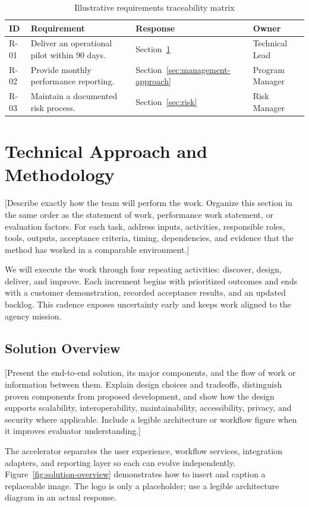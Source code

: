 \begin{table}[htbp]
\centering
\caption{Illustrative requirements traceability matrix}
\label{tab:compliance}
\begin{tabularx}{\textwidth}{@{}lXll@{}}
\toprule
ID & Requirement & Response & Owner \\
\midrule
R-01 & Deliver an operational pilot within 90 days. & Section~\ref{sec:technical-approach} & Technical Lead \\
R-02 & Provide monthly performance reporting. & Section~\ref{sec:management-approach} & Program Manager \\
R-03 & Maintain a documented risk process. & Section~\ref{sec:risk} & Risk Manager \\
\bottomrule
\end{tabularx}
\end{table}

\section{Technical Approach and Methodology}
\label{sec:technical-approach}
[Describe exactly how the team will perform the work. Organize this section in
the same order as the statement of work, performance work statement, or
evaluation factors. For each task, address inputs, activities, responsible
roles, tools, outputs, acceptance criteria, timing, dependencies, and evidence
that the method has worked in a comparable environment.]

We will execute the work through four repeating activities: discover, design,
deliver, and improve. Each increment begins with prioritized outcomes and ends
with a customer demonstration, recorded acceptance results, and an updated
backlog. This cadence exposes uncertainty early and keeps work aligned to the
agency mission.

\subsection{Solution Overview}
[Present the end-to-end solution, its major components, and the flow of work or
information between them. Explain design choices and tradeoffs, distinguish
proven components from proposed development, and show how the design supports
scalability, interoperability, maintainability, accessibility, privacy, and
security where applicable. Include a legible architecture or workflow figure
when it improves evaluator understanding.]

The accelerator separates the user experience, workflow services, integration
adapters, and reporting layer so each can evolve independently. Figure~\ref{fig:solution-overview}
demonstrates how to insert and caption a replaceable image. The logo is only a
placeholder; use a legible architecture diagram in an actual response.

